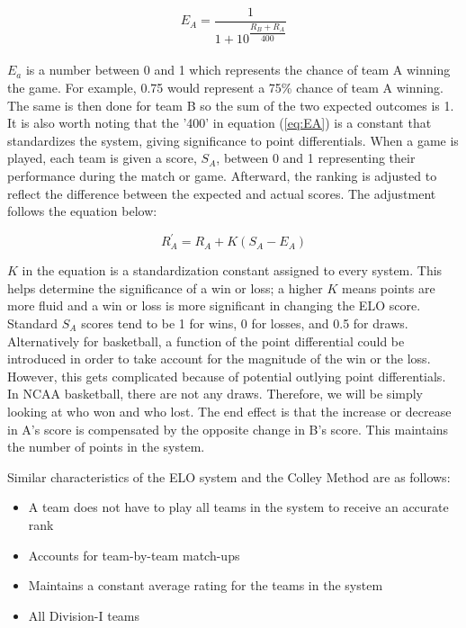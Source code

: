 \documentclass{article}
\begin{document}
\begin{equation}
E_A = \dfrac{1}{1+10^{\dfrac{R_B + R_A}{400}}}
\label{eq:EA}
\end{equation}\\

$E_a$ is a number between 0 and 1 which represents the chance of team A winning the game.  For example, 0.75 would represent a 75\% chance of team A winning. The same is then done for team B so the sum of the two expected outcomes is 1. It is also worth noting that the '400' in equation (\ref{eq:EA}) is a constant that standardizes the system, giving significance to point differentials. When a game is played, each team is given a score, $S_A$, between 0 and 1 representing their performance during the match or game. Afterward, the ranking is adjusted to reflect the difference between the expected and actual scores. The adjustment follows the equation below:

\begin{equation}
R_A^{'} = R_A + K(S_A - E_A)
\label{eq:RA}
\end{equation}

$K$ in the equation is a standardization constant assigned to every system. This helps determine the significance of a win or loss; a higher $K$ means points are more fluid and a win or loss is more significant in changing the ELO score. Standard $S_A$ scores tend to be 1 for wins, 0 for losses, and 0.5 for draws. Alternatively for basketball, a function of the point differential could be introduced in order to take account for the magnitude of the win or the loss. However, this gets complicated because of potential outlying point differentials. In NCAA basketball, there are not any draws. Therefore, we will be simply looking at who won and who lost. The end effect is that the increase or decrease in A's score is compensated by the opposite change in B's score. This maintains the number of points in the system.

Similar characteristics of the ELO system and the Colley Method are as follows:
\begin{itemize}
\item A team does not have to play all teams in the system to receive an accurate rank
\item Accounts for team-by-team match-ups
\item Maintains a constant average rating for the teams in the system
\item All Division-I teams
\end{itemize}
\end{document}
